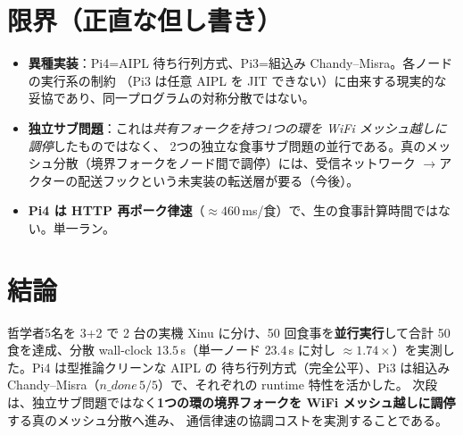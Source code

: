 \documentclass[11pt]{ltjsarticle}
\begin{document}
\section{限界（正直な但し書き）}
\begin{itemize}
  \item \textbf{異種実装}：Pi4=AIPL 待ち行列方式、Pi3=組込み Chandy--Misra。各ノードの実行系の制約
  （Pi3 は任意 AIPL を JIT できない）に由来する現実的な妥協であり、同一プログラムの対称分散ではない。
  \item \textbf{独立サブ問題}：これは\emph{共有フォークを持つ1つの環を WiFi メッシュ越しに調停}したものではなく、
  2つの独立な食事サブ問題の並行である。真のメッシュ分散（境界フォークをノード間で調停）には、受信ネットワーク
  $\to$アクターの配送フックという未実装の転送層が要る（今後）。
  \item \textbf{Pi4 は HTTP 再ポーク律速}（$\approx 460$\,ms/食）で、生の食事計算時間ではない。単一ラン。
\end{itemize}

\section{結論}
哲学者5名を 3+2 で 2 台の実機 Xinu に分け、50 回食事を\textbf{並行実行}して合計 50 食を達成、分散 wall-clock
$13.5$\,s（単一ノード $23.4$\,s に対し $\approx 1.74\times$）を実測した。Pi4 は型推論クリーンな AIPL の
待ち行列方式（完全公平）、Pi3 は組込み Chandy--Misra（$n\_done\,5/5$）で、それぞれの runtime 特性を活かした。
次段は、独立サブ問題ではなく\textbf{1つの環の境界フォークを WiFi メッシュ越しに調停}する真のメッシュ分散へ進み、
通信律速の協調コストを実測することである。
\end{document}
